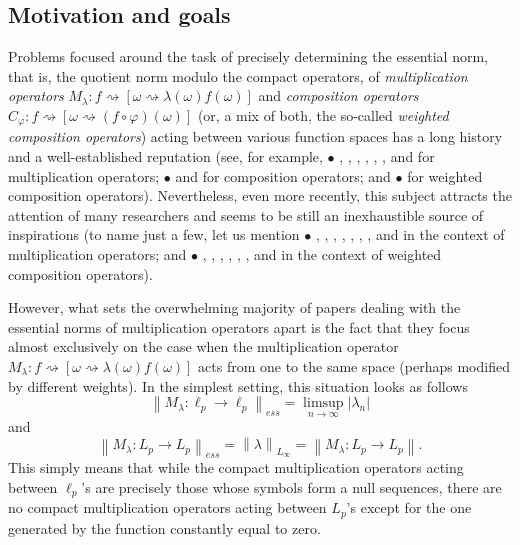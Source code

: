 \documentclass[11pt]{amsart}
\theoremstyle{definition}
\theoremstyle{definition}
\theoremstyle{definition}
\theoremstyle{definition}
\theoremstyle{definition}
\theoremstyle{definition}
\theoremstyle{definition}
\theoremstyle{definition}
\numberwithin{equation}{section}
\numberwithin{equation}{section}
\numberwithin{equation}{section}
\theoremstyle{definition}
\theoremstyle{definition}
\theoremstyle{definition}
\theoremstyle{definition}
\theoremstyle{definition}
\theoremstyle{definition}
\newcommand{\norm}[1]{\left\lVert#1\right\rVert}
\newcommand{\abs}[1]{\left\lvert#1\right\rvert}
\begin{document}
\subsection{Motivation and goals}
Problems focused around the task of precisely determining the essential norm, that is, the quotient norm modulo the compact operators,
of {\it multiplication operators} $M_{\lambda} \colon f \rightsquigarrow \left[ \omega \rightsquigarrow \lambda(\omega) f(\omega) \right]$
and {\it composition operators} $C_{\varphi} \colon f \rightsquigarrow \left[ \omega \rightsquigarrow (f \circ \varphi)(\omega) \right]$
(or, a mix of both, the so-called {\it weighted composition operators})
acting between various function spaces has a long history and a well-established reputation (see, for example,
$\bullet$ \cite{Axl82}, \cite{AJS80}, \cite{AS83}, \cite{BDL99b}, \cite{BRV99}, \cite{LR93}, \cite{ST94} and \cite{Sch80} for multiplication operators;
$\bullet$ \cite{BDL99} and \cite{Sha87} for composition operators; and
$\bullet$ \cite{MR00} for weighted composition operators).
Nevertheless, even more recently, this subject attracts the attention of many researchers and seems to be still an inexhaustible
source of inspirations (to name just a few, let us mention
$\bullet$ \cite{ABR18}, \cite{BR20}, \cite{DSZ11}, \cite{ES05}, \cite{GJL06}, \cite{GSZZ09}, \cite{DJL19}, \cite{Mle09} and \cite{Sch22} in the context of multiplication operators;
and $\bullet$ \cite{Bay23}, \cite{CHD03}, \cite{CZ03}, \cite{CZ07}, \cite{Dem11}, \cite{HKLRS12}, \cite{IIO11} and \cite{Lef09} in the context of weighted composition operators).

However, what sets the overwhelming majority of papers dealing with the essential norms of multiplication operators apart
is the fact that they focus almost exclusively on the case when the multiplication operator
$M_{\lambda} \colon f \rightsquigarrow \left[ \omega \rightsquigarrow \lambda(\omega) f(\omega) \right]$
acts from one to the same space (perhaps modified by different weights). In the simplest setting, this situation looks as follows
\begin{equation} \label{EQ: ess norm lp -> lp}
	\norm{M_{\lambda} \colon \ell_p \rightarrow \ell_p}_{ess} = \limsup_{n \rightarrow \infty} \abs{\lambda_n}
\end{equation}
and
\begin{equation*}
	\norm{M_{\lambda} \colon L_p \rightarrow L_p}_{ess} = \norm{\lambda}_{L_{\infty}} = \norm{M_{\lambda} \colon L_p \rightarrow L_p}.
\end{equation*}
This simply means that while the compact multiplication operators acting between $\ell_p$'s are precisely those whose symbols form a null sequences,
there are no compact multiplication operators acting between $L_p$'s except for the one generated by the function constantly equal to zero.
\end{document}
